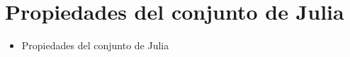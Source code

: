 \chapter{Propiedades del conjunto de Julia}

\begin{itemize}
    \item Propiedades del conjunto de Julia
\end{itemize}